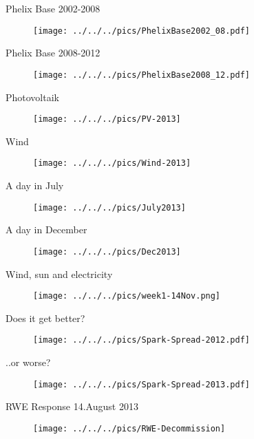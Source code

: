 
{Phelix Base 2002-2008}
\begin{figure}[htp]
\centering
\texttt{[image: ../../../pics/PhelixBase2002\_08.pdf]}

\end{figure}

{Phelix Base 2008-2012}
\begin{figure}[htp]
\centering
\texttt{[image: ../../../pics/PhelixBase2008\_12.pdf]}

\end{figure}


{Photovoltaik}
\begin{figure}[htp]
\centering
\texttt{[image: ../../../pics/PV-2013]}
\label{prices}
\end{figure}

{Wind}
\begin{figure}[htp]
\centering
\texttt{[image: ../../../pics/Wind-2013]}
\label{prices}
\end{figure}

{A day in July}
\begin{figure}[htp]
\centering
\texttt{[image: ../../../pics/July2013]}
\end{figure}

{A day in December}
\begin{figure}[htp]
\centering
\texttt{[image: ../../../pics/Dec2013]}
\end{figure}

{Wind, sun and electricity}
\begin{figure}[htp]
\centering
\texttt{[image: ../../../pics/week1-14Nov.png]}
\end{figure}

{Does it get better?}
\begin{figure}[htp]
\centering
\texttt{[image: ../../../pics/Spark-Spread-2012.pdf]}
\end{figure}

{..or worse?}
\begin{figure}[htp]
\centering
\texttt{[image: ../../../pics/Spark-Spread-2013.pdf]}
\end{figure}

{RWE Response 14.August 2013}
\begin{figure}[htp]
\centering
\texttt{[image: ../../../pics/RWE-Decommission]}
\end{figure}

